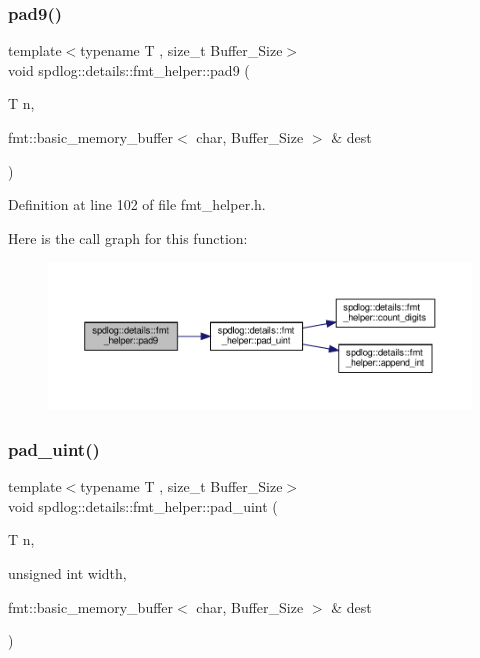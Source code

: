 \subsubsection{\texorpdfstring{pad9()}{pad9()}}
{\footnotesize\ttfamily template$<$typename T , size\+\_\+t Buffer\+\_\+\+Size$>$ \\
void spdlog\+::details\+::fmt\+\_\+helper\+::pad9 (\begin{DoxyParamCaption}\item[{T}]{n,  }\item[{fmt\+::basic\+\_\+memory\+\_\+buffer$<$ char, Buffer\+\_\+\+Size $>$ \&}]{dest }\end{DoxyParamCaption})\hspace{0.3cm}{\ttfamily [inline]}}



Definition at line 102 of file fmt\+\_\+helper.\+h.

Here is the call graph for this function\+:
\nopagebreak
\begin{figure}[H]
\begin{center}
\leavevmode
\includegraphics[width=350pt]{namespacespdlog_1_1details_1_1fmt__helper_aad467c706932b56929dae091b39c23f3_cgraph}
\end{center}
\end{figure}
\mbox{\label{namespacespdlog_1_1details_1_1fmt__helper_a569553750f9f2fa7b16c94a56a398de3}} 
\subsubsection{\texorpdfstring{pad\+\_\+uint()}{pad\_uint()}}
{\footnotesize\ttfamily template$<$typename T , size\+\_\+t Buffer\+\_\+\+Size$>$ \\
void spdlog\+::details\+::fmt\+\_\+helper\+::pad\+\_\+uint (\begin{DoxyParamCaption}\item[{T}]{n,  }\item[{unsigned int}]{width,  }\item[{fmt\+::basic\+\_\+memory\+\_\+buffer$<$ char, Buffer\+\_\+\+Size $>$ \&}]{dest }\end{DoxyParamCaption})\hspace{0.3cm}{\ttfamily [inline]}}



